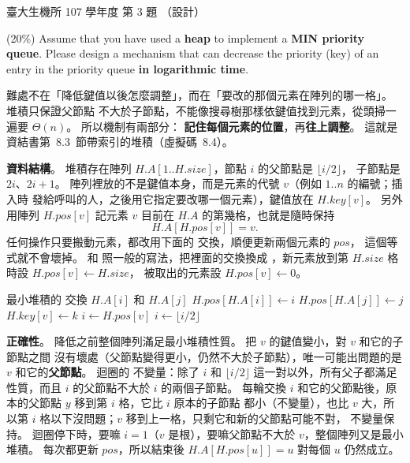 \begin{pastexam}[label={px:ntu-107-bime-ds-03}]{臺大生機所 107 學年度 第 3 題}
（設計）

(20\%) Assume that you have used a \textbf{heap} to implement a \textbf{MIN priority queue}. Please
design a mechanism that can decrease the priority (key) of an entry in the priority queue
\textbf{in logarithmic time}.
\end{pastexam}

\begin{pastsoln}
難處不在「降低鍵值以後怎麼調整」，而在「要改的那個元素在陣列的哪一格」。 堆積只保證父節點
不大於子節點，不能像搜尋樹那樣依鍵值找到元素，從頭掃一遍要 $\Theta(n)$。 所以機制有兩部分：
\textbf{記住每個元素的位置}，再\textbf{往上調整}。 這就是資結書第~8.3~節帶索引的堆積（虛擬碼~8.4）。

\textbf{資料結構}。 堆積存在陣列 $H.A[1..H.\mathit{size}]$，節點 $i$ 的父節點是 $\lfloor i/2 \rfloor$，
子節點是 $2i$、$2i + 1$。 陣列裡放的不是鍵值本身，而是元素的代號 $v$（例如 $1..n$ 的編號；插入時
發給呼叫的人，之後用它指定要改哪一個元素），鍵值放在 $H.\mathit{key}[v]$。 另外用陣列
$H.\mathit{pos}[v]$ 記元素 $v$ 目前在 $H.A$ 的第幾格，也就是隨時保持
\[
  H.A[H.\mathit{pos}[v]] = v .
\]
任何操作只要搬動元素，都改用下面的  交換，順便更新兩個元素的 $\mathit{pos}$，
這個等式就不會壞掉。  和  照一般的寫法，把裡面的交換換成
，新元素放到第 $H.\mathit{size}$ 格時設 $H.\mathit{pos}[v] \gets H.\mathit{size}$，
被取出的元素設 $H.\mathit{pos}[v] \gets 0$。

\begin{pseudo}{最小堆積的 }
    \State 交換 $H.A[i]$ 和 $H.A[j]$
    \State $H.\mathit{pos}[H.A[i]] \gets i$
    \State $H.\mathit{pos}[H.A[j]] \gets j$
\EndProcedure
\Statex
{}
        \State {}
    \EndIf
    \State $H.\mathit{key}[v] \gets k$
    \State $i \gets H.\mathit{pos}[v]$ 
        \State {} 
        \State $i \gets \lfloor i/2 \rfloor$
    \EndWhile
\EndProcedure
\end{pseudo}

\textbf{正確性}。 降低之前整個陣列滿足最小堆積性質。 把 $v$ 的鍵值變小，對 $v$ 和它的子節點之間
沒有壞處（父節點變得更小，仍然不大於子節點），唯一可能出問題的是 $v$ 和它的\textbf{父節點}。 迴圈的
不變量：除了 $i$ 和 $\lfloor i/2 \rfloor$ 這一對以外，所有父子都滿足性質，而且 $i$ 的父節點不大於
$i$ 的兩個子節點。 每輪交換 $i$ 和它的父節點後，原本的父節點 $y$ 移到第 $i$ 格，它比 $i$ 原本的子節點
都小（不變量），也比 $v$ 大，所以第 $i$ 格以下沒問題；$v$ 移到上一格，只剩它和新的父節點可能不對，
不變量保持。 迴圈停下時，要嘛 $i = 1$（$v$ 是根），要嘛父節點不大於 $v$，整個陣列又是最小堆積。
 每次都更新 $\mathit{pos}$，所以結束後 $H.A[H.\mathit{pos}[u]] = u$ 對每個 $u$ 仍然成立。


\end{pastsoln}
